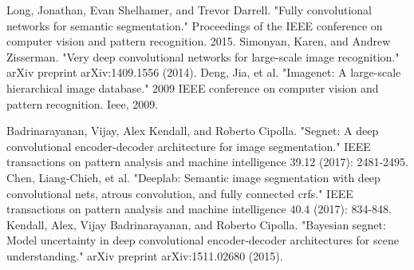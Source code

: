 \documentclass[transmag]{IEEEtran}
\begin{document}
\begin{thebibliography}{00}
 Long, Jonathan, Evan Shelhamer, and Trevor Darrell. "Fully convolutional networks for semantic segmentation." Proceedings of the IEEE conference on computer vision and pattern recognition. 2015.
 Simonyan, Karen, and Andrew Zisserman. "Very deep convolutional networks for large-scale image recognition." arXiv preprint arXiv:1409.1556 (2014).
 Deng, Jia, et al. "Imagenet: A large-scale hierarchical image database." 2009 IEEE conference on computer vision and pattern recognition. Ieee, 2009.

Badrinarayanan, Vijay, Alex Kendall, and Roberto Cipolla. "Segnet: A deep convolutional encoder-decoder architecture for image segmentation." IEEE transactions on pattern analysis and machine intelligence 39.12 (2017): 2481-2495.
Chen, Liang-Chieh, et al. "Deeplab: Semantic image segmentation with deep convolutional nets, atrous convolution, and fully connected crfs." IEEE transactions on pattern analysis and machine intelligence 40.4 (2017): 834-848.
Kendall, Alex, Vijay Badrinarayanan, and Roberto Cipolla. "Bayesian segnet: Model uncertainty in deep convolutional encoder-decoder architectures for scene understanding." arXiv preprint arXiv:1511.02680 (2015).
\end{thebibliography}
\end{document}
